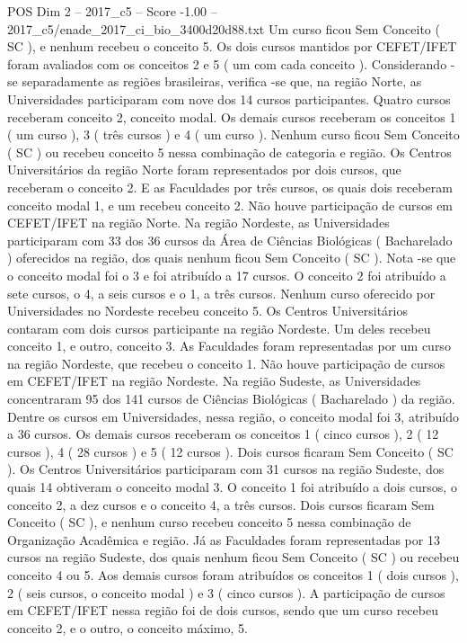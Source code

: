 \begin{textsample}{POS Dim 2 – 2017\_c5 – Score -1.00 – 2017\_c5/enade\_2017\_ci\_bio\_3400d20d88.txt}
Um curso ficou Sem Conceito ( SC ), e nenhum recebeu o conceito 5.
Os dois cursos mantidos por CEFET/IFET foram avaliados com os conceitos 2 e 5 ( um com cada conceito ).
Considerando -se separadamente as regiões brasileiras, verifica -se que, na região Norte, as Universidades participaram com nove dos 14 cursos participantes.
Quatro cursos receberam conceito 2, conceito modal.
Os demais cursos receberam os conceitos 1 ( um curso ), 3 ( três cursos ) e 4 ( um curso ).
Nenhum curso ficou Sem Conceito ( SC ) ou recebeu conceito 5 nessa combinação de categoria e região.
Os Centros Universitários da região Norte foram representados por dois cursos, que receberam o conceito 2.
E as Faculdades por três cursos, os quais dois receberam conceito modal 1, e um recebeu conceito 2.
Não houve participação de cursos em CEFET/IFET na região Norte.
Na região Nordeste, as Universidades participaram com 33 dos 36 cursos da Área de Ciências Biológicas ( Bacharelado ) oferecidos na região, dos quais nenhum ficou Sem Conceito ( SC ).
Nota -se que o conceito modal foi o 3 e foi atribuído a 17 cursos.
O conceito 2 foi atribuído a sete cursos, o 4, a seis cursos e o 1, a três cursos.
Nenhum curso oferecido por Universidades no Nordeste recebeu conceito 5.
Os Centros Universitários contaram com dois cursos participante na região Nordeste.
Um deles recebeu conceito 1, e outro, conceito 3.
As Faculdades foram representadas por um curso na região Nordeste, que recebeu o conceito 1.
Não houve participação de cursos em CEFET/IFET na região Nordeste.
Na região Sudeste, as Universidades concentraram 95 dos 141 cursos de Ciências Biológicas ( Bacharelado ) da região.
Dentre os cursos em Universidades, nessa região, o conceito modal foi 3, atribuído a 36 cursos.
Os demais cursos receberam os conceitos 1 ( cinco cursos ), 2 ( 12 cursos ), 4 ( 28 cursos ) e 5 ( 12 cursos ).
Dois cursos ficaram Sem Conceito ( SC ).
Os Centros Universitários participaram com 31 cursos na região Sudeste, dos quais 14 obtiveram o conceito modal 3.
O conceito 1 foi atribuído a dois cursos, o conceito 2, a dez cursos e o conceito 4, a três cursos.
Dois cursos ficaram Sem Conceito ( SC ), e nenhum curso recebeu conceito 5 nessa combinação de Organização Acadêmica e região.
Já as Faculdades foram representadas por 13 cursos na região Sudeste, dos quais nenhum ficou Sem Conceito ( SC ) ou recebeu conceito 4 ou 5.
Aos demais cursos foram atribuídos os conceitos 1 ( dois cursos ), 2 ( seis cursos, o conceito modal ) e 3 ( cinco cursos ).
A participação de cursos em CEFET/IFET nessa região foi de dois cursos, sendo que um curso recebeu conceito 2, e o outro, o conceito máximo, 5.

\end{textsample}
